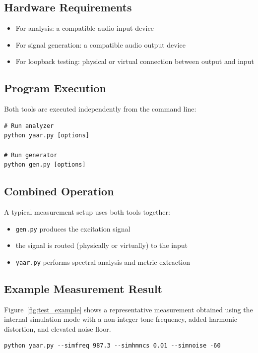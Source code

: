 \documentclass[conference]{IEEEtran}
\begin{document}
\subsection{Hardware Requirements}
\begin{itemize}[leftmargin=*,nosep]
    \item For analysis: a compatible audio input device
    \item For signal generation: a compatible audio output device
    \item For loopback testing: physical or virtual connection between output and input
\end{itemize}

\subsection{Program Execution}
Both tools are executed independently from the command line:

\begin{lstlisting}[style=shellstyle]
# Run analyzer
python yaar.py [options]

# Run generator
python gen.py [options]
\end{lstlisting}

\subsection{Combined Operation}
A typical measurement setup uses both tools together:
\begin{itemize}[leftmargin=*,nosep]
    \item \texttt{gen.py} produces the excitation signal
    \item the signal is routed (physically or virtually) to the input
    \item \texttt{yaar.py} performs spectral analysis and metric extraction
\end{itemize}

\subsection{Example Measurement Result}

Figure~\ref{fig:test_example} shows a representative measurement obtained using the internal simulation mode with a non-integer tone frequency, added harmonic distortion, and elevated noise floor.

\begin{lstlisting}[style=shellstyle]
python yaar.py --simfreq 987.3 --simhmncs 0.01 --simnoise -60
\end{lstlisting}
\end{document}
